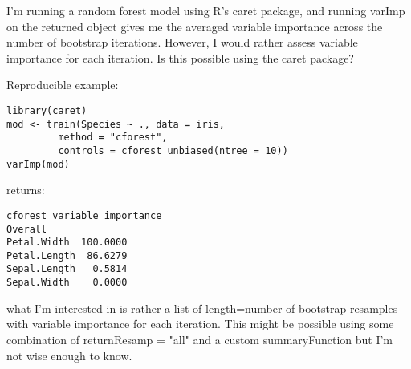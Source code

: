 I'm running a random forest model using R's caret package, and running varImp on the returned object gives me the averaged variable importance across the number of bootstrap iterations. However, I would rather assess variable importance for each iteration. Is this possible using the caret package?

Reproducible example:
\begin{verbatim}
library(caret)
mod <- train(Species ~ ., data = iris,
         method = "cforest",
         controls = cforest_unbiased(ntree = 10))
varImp(mod)
\end{verbatim}
returns:
\begin{verbatim}
cforest variable importance
Overall
Petal.Width  100.0000
Petal.Length  86.6279
Sepal.Length   0.5814
Sepal.Width    0.0000 
\end{verbatim}
what I'm interested in is rather a list of length=number of bootstrap resamples with variable importance for each iteration. This might be possible using some combination of returnResamp = "all" and a custom summaryFunction but I'm not wise enough to know.



